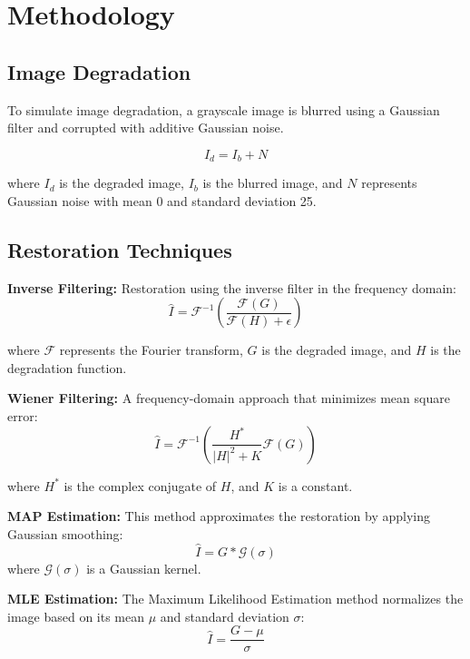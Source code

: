 \documentclass{report}
\begin{document}
\section{Methodology}

\subsection{Image Degradation}
To simulate image degradation, a grayscale image is blurred using a Gaussian filter and corrupted with additive Gaussian noise.

\begin{equation}
I_d = I_b + N
\end{equation}

where $I_d$ is the degraded image, $I_b$ is the blurred image, and $N$ represents Gaussian noise with mean 0 and standard deviation 25.

\subsection{Restoration Techniques}

\textbf{Inverse Filtering:} Restoration using the inverse filter in the frequency domain:
\begin{equation}
\hat{I} = \mathcal{F}^{-1} \left( \frac{\mathcal{F}(G)}{\mathcal{F}(H) + \epsilon} \right)
\end{equation}

where $\mathcal{F}$ represents the Fourier transform, $G$ is the degraded image, and $H$ is the degradation function.

\textbf{Wiener Filtering:} A frequency-domain approach that minimizes mean square error:
\begin{equation}
\hat{I} = \mathcal{F}^{-1} \left( \frac{H^*}{|H|^2 + K} \mathcal{F}(G) \right)
\end{equation}

where $H^*$ is the complex conjugate of $H$, and $K$ is a constant.

\textbf{MAP Estimation:} This method approximates the restoration by applying Gaussian smoothing:
\begin{equation}
\hat{I} = G \ast \mathcal{G}(\sigma)
\end{equation}
where $\mathcal{G}(\sigma)$ is a Gaussian kernel.

\textbf{MLE Estimation:} The Maximum Likelihood Estimation method normalizes the image based on its mean $\mu$ and standard deviation $\sigma$:
\begin{equation}
\hat{I} = \frac{G - \mu}{\sigma}
\end{equation}
\end{document}
